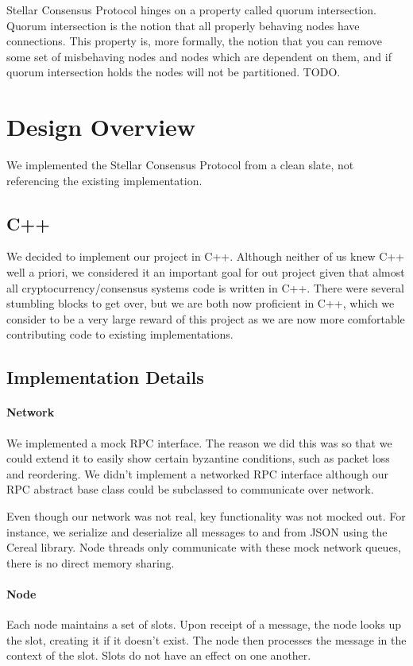 \documentclass[preprint,11pt]{article} \usepackage{amsmath}
\begin{document}
Stellar Consensus Protocol hinges on a property called quorum
intersection.  Quorum intersection is the notion that all properly
behaving nodes have connections.  This property is, more formally, the
notion that you can remove some set of misbehaving nodes and nodes
which are dependent on them, and if quorum intersection holds the
nodes will not be partitioned. TODO.



\section{Design Overview}
We implemented the Stellar Consensus Protocol from a clean slate, not
referencing the existing implementation.
\subsection{C++}
We decided to implement our project in C++. Although neither of us
knew C++ well a priori, we considered it an important goal for out
project given that almost all cryptocurrency/consensus systems code is
written in C++. There were several stumbling blocks to get over, but
we are both now proficient in C++, which we consider to be a very
large reward of this project as we are now more comfortable
contributing code to existing implementations.
\subsection{Implementation Details}
\paragraph{Network}
We implemented a mock RPC interface. The reason we did this was so
that we could extend it to easily show certain byzantine conditions,
such as packet loss and reordering. We didn't implement a networked
RPC interface although our RPC abstract base class could be subclassed
to communicate over network.

Even though our network was not real, key functionality was not mocked
out.  For instance, we serialize and deserialize all messages to and
from JSON using the Cereal library. Node threads only communicate with
these mock network queues, there is no direct memory sharing.

\paragraph{Node}
Each node maintains a set of slots. Upon receipt of a message, the
node looks up the slot, creating it if it doesn't exist.  The node
then processes the message in the context of the slot. Slots do not
have an effect on one another.
\end{document}

